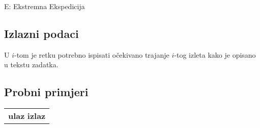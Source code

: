 \begin{statement}[
  timelimit=1 s,
  memorylimit=512 MiB,
]{E: Ekstremna Ekspedicija}
\subsection*{Izlazni podaci}
U $i$-tom je retku potrebno ispisati očekivano trajanje $i$-tog izleta kako
je opisano u tekstu zadatka.

\subsection*{Probni primjeri}
\begin{tabularx}{\textwidth}{X}
  \textbf{ulaz}
  \linespread{1}{}
  \textbf{izlaz}
  \linespread{1}{}
\end{tabularx}

\end{statement}

